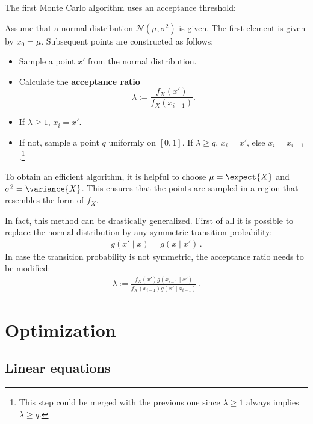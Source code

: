     The first Monte Carlo algorithm uses an acceptance threshold:
    \begin{method}
        Assume that a normal distribution $\mathcal{N}(\mu,\sigma^2)$ is given. The first element is given by $x_0=\mu$. Subsequent points are constructed as follows:
        \begin{itemize}
            \item Sample a point $x'$ from the normal distribution.
            \item Calculate the \textbf{acceptance ratio} \[\lambda := \frac{f_X(x')}{f_X(x_{i-1})}.\]
            \item If $\lambda\geq1$, $x_i=x'$.
            \item If not, sample a point $q$ uniformly on $[0,1]$. If $\lambda\geq q$, $x_i=x'$, else $x_i=x_{i-1}$.\footnote{This step could be merged with the previous one since $\lambda\geq1$ always implies $\lambda\geq q$.}
        \end{itemize}
        To obtain an efficient algorithm, it is helpful to choose $\mu=\expect{X}$ and $\sigma^2=\variance{X}$. This ensures that the points are sampled in a region that resembles the form of $f_X$.

        In fact, this method can be drastically generalized. First of all it is possible to replace the normal distribution by any symmetric transition probability:
        \begin{gather}
            g(x'\mid x) = g(x\mid x')\,.
        \end{gather}
        In case the transition probability is not symmetric, the acceptance ratio needs to be modified:
        \begin{gather}
            \lambda := \frac{f_X(x')g(x_{i-1}\mid x')}{f_X(x_{i-1})g(x'\mid x_{i-1})}\,.
        \end{gather}
    \end{method}

\section{Optimization}
\subsection{Linear equations}

